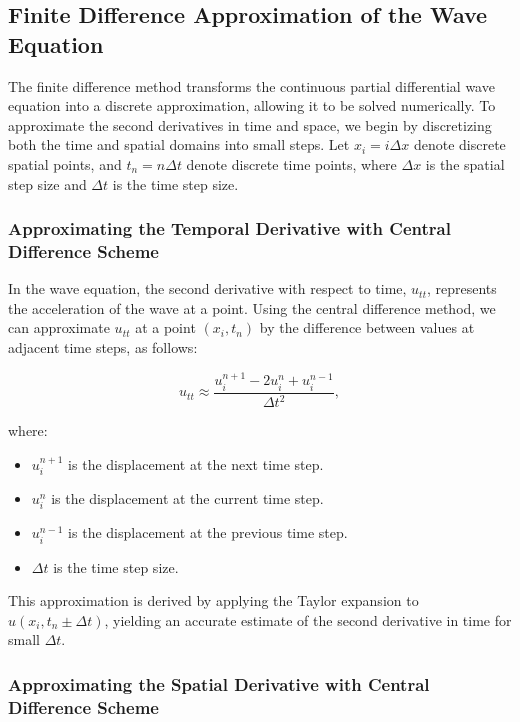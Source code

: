 \documentclass{article}
\begin{document}
		\subsection{Finite Difference Approximation of the Wave Equation}
		
		The finite difference method transforms the continuous partial differential wave equation into a discrete approximation, allowing it to be solved numerically. To approximate the second derivatives in time and space, we begin by discretizing both the time and spatial domains into small steps. Let $x_i = i \Delta x$ denote discrete spatial points, and $t_n = n \Delta t$ denote discrete time points, where $\Delta x$ is the spatial step size and $\Delta t$ is the time step size.
		
			\subsubsection{Approximating the Temporal Derivative with Central Difference Scheme}
			
			In the wave equation, the second derivative with respect to time, $u_{tt}$, represents the acceleration of the wave at a point. Using the central difference method, we can approximate $u_{tt}$ at a point $(x_i, t_n)$ by the difference between values at adjacent time steps, as follows:
			
			\begin{equation}
				u_{tt} \approx \frac{u_i^{n+1} - 2u_i^n + u_i^{n-1}}{\Delta t^2},
			\end{equation}
			
			where:
			\begin{itemize}
				\item $u_i^{n+1}$ is the displacement at the next time step.
				\item $u_i^n$ is the displacement at the current time step.
				\item $u_i^{n-1}$ is the displacement at the previous time step.
				\item $\Delta t$ is the time step size.
			\end{itemize}
			
			This approximation is derived by applying the Taylor expansion to $u(x_i, t_n \pm \Delta t)$, yielding an accurate estimate of the second derivative in time for small $\Delta t$.
			
			\subsubsection{Approximating the Spatial Derivative with Central Difference Scheme}
			
\end{document}

